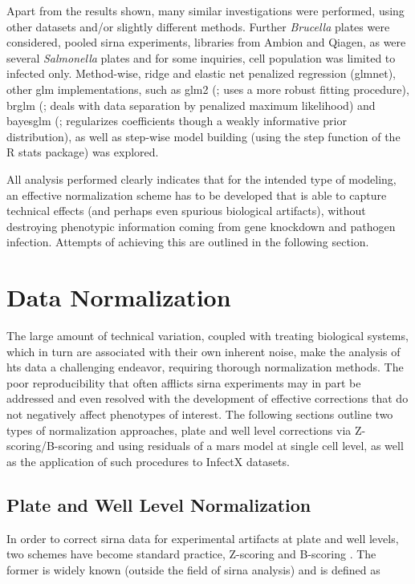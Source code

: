 Apart from the results shown, many similar investigations were performed, using other datasets and\slash or slightly different methods. Further \textit{Brucella} plates were considered, pooled \gls{sirna} experiments, libraries from Ambion and Qiagen, as were several \textit{Salmonella} plates and for some inquiries, cell population was limited to infected only. Method-wise, ridge and elastic net penalized regression (glmnet), other glm implementations, such as glm2 (\cite{Marschner2014}; uses a more robust fitting procedure), brglm (\cite{Kosmidis2013}; deals with data separation by penalized maximum likelihood) and bayesglm (\cite{Gelman2015}; regularizes coefficients though a weakly informative prior distribution), as well as step-wise model building (using the step function of the R stats package) was explored.


All analysis performed clearly indicates that for the intended type of modeling, an effective normalization scheme has to be developed that is able to capture technical effects (and perhaps even spurious biological artifacts), without destroying phenotypic information coming from gene knockdown and pathogen infection. Attempts of achieving this are outlined in the following section.

\section{Data Normalization}
\label{sec:data-normalization}
The large amount of technical variation, coupled with treating biological systems, which in turn are associated with their own inherent noise, make the analysis of \gls{hts} data a challenging endeavor, requiring thorough normalization methods. The poor reproducibility that often afflicts \gls{sirna} experiments may in part be addressed and even resolved with the development of effective corrections that do not negatively affect phenotypes of interest. The following sections outline two types of normalization approaches, plate and well level corrections via Z-scoring\slash B-scoring and using residuals of a \gls{mars} model at single cell level, as well as the application of such procedures to InfectX datasets.

\subsection{Plate and Well Level Normalization}
In order to correct \gls{sirna} data for experimental artifacts at plate and well levels, two schemes have become standard practice, Z-scoring and B-scoring \citep{Malo2006}. The former is widely known (outside the field of \gls{sirna} analysis) and is defined as


